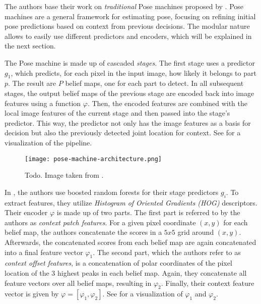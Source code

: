The authors base their work on \textit{traditional} Pose machines proposed by \cite{ramakrishna_pose_2014}.
Pose machines are a general framework for estimating pose, focusing on refining initial pose predictions based on context from previous decisions.
The modular nature allows to easily use different predictors and encoders, which will be explained in the next section.

The Pose machine is made up of cascaded \textit{stages}.
The first stage uses a predictor $g_1$, which predicts, for each pixel in the input image, how likely it belongs to part $p$.
The result are $P$ belief maps, one for each part to detect.
In all subsequent stages, the output belief maps of the previous stage are encoded back into image features using a function $\varphi$.
Then, the encoded features are combined with the local image features of the current stage and then passed into the stage's predictor.
This way, the predictor not only has the image features as a basis for decision but also the previously detected joint location for context.
See  for a visualization of the pipeline.

\begin{figure}[htb!]
    \centering
    \texttt{[image: pose-machine-architecture.png]}
    \caption{Todo. Image taken from \cite{wei_convolutional_2016}.}
    \label{fig:pose-machines-architecture}
\end{figure}


In \cite{ramakrishna_pose_2014}, the authors use boosted random forests for their stage predictors $g_i$.
To extract features, they utilize \textit{Histogram of Oriented Gradients (HOG)} descriptors.
Their encoder $\varphi$ is made up of two parts.
The first part is referred to by the authors as \textit{context patch features}.
For a given pixel coordinate $(x, y)$ for each belief map, the authors concatenate the scores in a $5 x 5$ grid around $(x,y)$.
Afterwards, the concatenated scores from each belief map are again concatenated into a final feature vector $\varphi_1$.
The second part, which the authors refer to as \textit{context offset features}, is a concatenation of polar coordinates of the pixel location of the $3$ highest peaks in each belief map.
Again, they concatenate all feature vectors over all belief maps, resulting in $\varphi_2$.
Finally, their context feature vector is given by $\varphi = [\varphi_1, \varphi_2]$.
See  for a visualization of $\varphi_1$ and $\varphi_2$.

